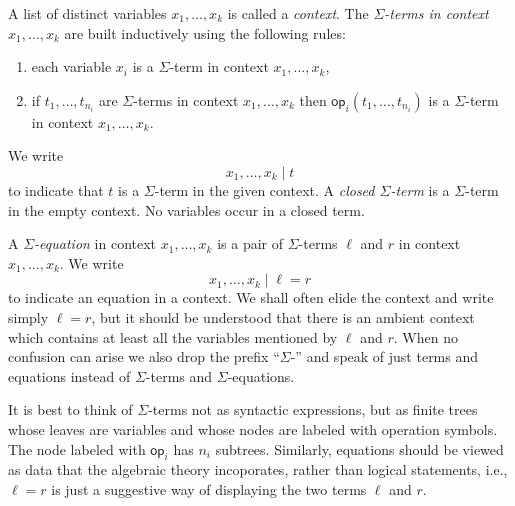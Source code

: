 \documentclass{amsart}
\newcommand{\op}{\mathsf{op}}
\begin{document}
A list of distinct variables $x_1, \ldots, x_k$ is called a \emph{context}. The
\emph{$\Sigma$-terms in context $x_1, \ldots, x_k$} are built inductively using the
following rules:
% 
\begin{enumerate}
\item each variable $x_i$ is a $\Sigma$-term in context $x_1, \ldots, x_k$,
\item if $t_1, \ldots, t_{n_i}$ are $\Sigma$-terms in context $x_1, \ldots, x_k$ then
  $\op_i(t_1, \ldots, t_{n_i})$ is a $\Sigma$-term in context $x_1, \ldots, x_k$.
\end{enumerate}
%
We write
%
\begin{equation*}
  x_1, \ldots, x_k \mid t
\end{equation*}
%
to indicate that $t$ is a $\Sigma$-term in the given context. A \emph{closed
  $\Sigma$-term} is a $\Sigma$-term in the empty context. No variables occur
in a closed term.

A \emph{$\Sigma$-equation} in context $x_1, \ldots, x_k$ is a pair of $\Sigma$-terms
$\ell$ and $r$ in context $x_1, \ldots, x_k$. We write
%
\begin{equation*}
  x_1, \ldots, x_k \mid \ell = r
\end{equation*}
%
to indicate an equation in a context. We shall often elide the context and write simply
$\ell = r$, but it should be understood that there is an ambient context which contains at
least all the variables mentioned by $\ell$ and $r$. When no confusion can arise we also
drop the prefix ``$\Sigma$-'' and speak of just terms and equations instead of
$\Sigma$-terms and $\Sigma$-equations.

It is best to think of $\Sigma$-terms not as syntactic expressions, but as finite trees
whose leaves are variables and whose nodes are labeled with operation symbols. The node
labeled with $\op_i$ has $n_i$ subtrees. Similarly, equations should be viewed as data
that the algebraic theory incoporates, rather than logical statements, i.e., $\ell = r$ is
just a suggestive way of displaying the two terms $\ell$ and $r$.
\end{document}
